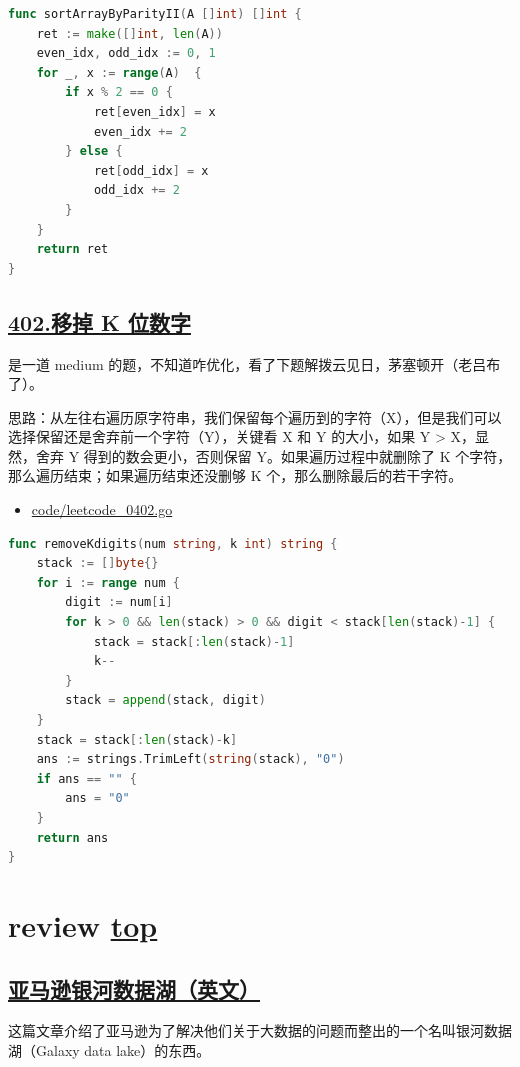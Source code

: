\begin{lstlisting}[language=go]
func sortArrayByParityII(A []int) []int {
	ret := make([]int, len(A))
	even_idx, odd_idx := 0, 1
	for _, x := range(A)  {
		if x % 2 == 0 {
			ret[even_idx] = x
			even_idx += 2
		} else {
			ret[odd_idx] = x
			odd_idx += 2
		}
	}
	return ret
}
\end{lstlisting}

\subsection{\href{https://leetcode-cn.com/problems/remove-k-digits/}{402.移掉 K 位数字}}

是一道 medium 的题，不知道咋优化，看了下题解拨云见日，茅塞顿开（老吕布了）。

思路：从左往右遍历原字符串，我们保留每个遍历到的字符（X），但是我们可以选择保留还是舍弃前一个字符（Y），关键看 X 和 Y 的大小，如果 Y > X，显然，舍弃 Y 得到的数会更小，否则保留 Y。如果遍历过程中就删除了 K 个字符，那么遍历结束；如果遍历结束还没删够 K 个，那么删除最后的若干字符。

\begin{itemize}
  \item \href{https://github.com/taseikyo/arts/blob/master/code/leetcode_0402.go}{code/leetcode\_0402.go}
\end{itemize}

\begin{lstlisting}[language=Go]
func removeKdigits(num string, k int) string {
	stack := []byte{}
	for i := range num {
		digit := num[i]
		for k > 0 && len(stack) > 0 && digit < stack[len(stack)-1] {
			stack = stack[:len(stack)-1]
			k--
		}
		stack = append(stack, digit)
	}
	stack = stack[:len(stack)-k]
	ans := strings.TrimLeft(string(stack), "0")
	if ans == "" {
		ans = "0"
	}
	return ans
}
\end{lstlisting}

\section{review \hyperref[chap:w3]{top}}\label{w3:review}

\subsection{\href{https://www.allthingsdistributed.com/2020/01/aws-datalake.html}{亚马逊银河数据湖（英文）}}

这篇文章介绍了亚马逊为了解决他们关于大数据的问题而整出的一个名叫银河数据湖（Galaxy data lake）的东西。

